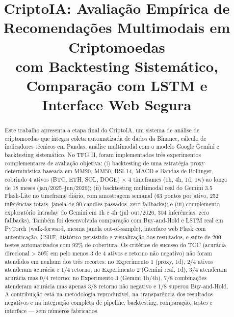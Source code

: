 \documentclass[conference]{IEEEtran}
\begin{document}
\title{CriptoIA: Avaliação Empírica de Recomendações Multimodais em Criptomoedas\\com Backtesting Sistemático, Comparação com LSTM e Interface Web Segura}

\author{
  \and
}

\maketitle

\begin{abstract}
Este trabalho apresenta a etapa final do CriptoIA, um sistema de análise de criptomoedas que integra coleta automatizada de dados da Binance, cálculo de indicadores técnicos em Pandas, análise multimodal com o modelo Google Gemini e backtesting sistemático. No TFG II, foram implementados três experimentos complementares de avaliação objetiva: (i) backtesting de uma estratégia proxy determinística baseada em MM20, MM50, RSI-14, MACD e Bandas de Bollinger, cobrindo 4 ativos (BTC, ETH, SOL, DOGE) × 4 timeframes (1h, 4h, 1d, 1w) ao longo de 18 meses (jan/2025–jun/2026); (ii) backtesting multimodal real do Gemini 3.5 Flash-Lite no timeframe diário, com amostragem semanal (63 pontos por ativo, 252 inferências totais, janela de 90 candles passados, zero fallbacks); e (iii) complemento exploratório intraday do Gemini em 1h e 4h (jul–out/2026, 304 inferências, zero fallbacks). Também foi desenvolvida comparação com Buy-and-Hold e LSTM real em PyTorch (walk-forward, mesma janela out-of-sample), interface web Flask com autenticação, CSRF, histórico persistido e visualização dos resultados, e suíte de 200 testes automatizados com 92\% de cobertura. Os critérios de sucesso do TCC (acurácia direcional > 50\% em pelo menos 3 de 4 ativos e retorno não negativo) não foram atendidos em nenhum dos três recortes: no Experimento 1 (proxy, 1d), 2/4 ativos atenderam acurácia e 1/4 retorno; no Experimento 2 (Gemini real, 1d), 3/4 atenderam acurácia mas 0/4 retorno; no Experimento 3 (Gemini 1h/4h), 7/8 combinações atenderam acurácia mas apenas 3/8 retorno não negativo e 1/8 superou Buy-and-Hold. A contribuição está na metodologia reproduzível, na transparência dos resultados negativos e na integração completa de pipeline, backtesting, comparação, testes e interface — sem números fabricados.
\end{abstract}
\end{document}
